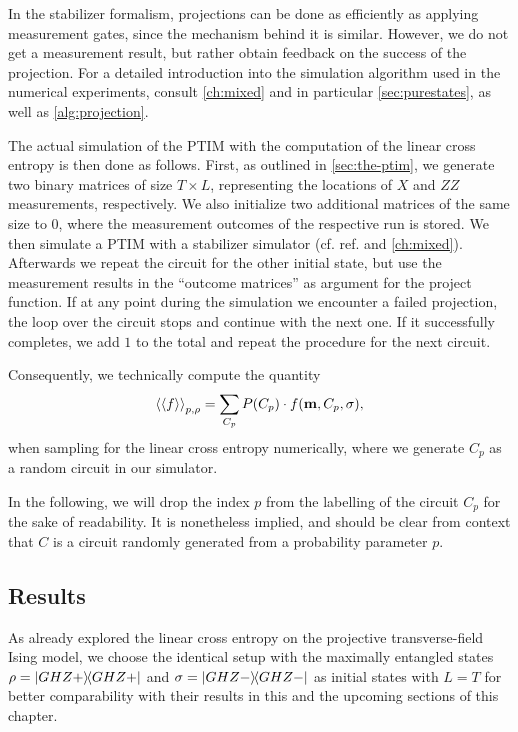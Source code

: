In the stabilizer
formalism, projections can be done as efficiently as applying measurement
gates,
since the mechanism behind it is similar. However, we do not get a measurement
result, but rather obtain feedback on the success of the projection.
For a detailed introduction into the
simulation algorithm used in the numerical experiments, consult \cref{ch:mixed}
and in particular \cref{sec:purestates}, as well as \cref{alg:projection}.

The actual simulation of the PTIM with the computation of the linear cross
entropy is then done as follows. First, as outlined in \cref{sec:the-ptim},
we generate two binary matrices of size $T\times L$, representing the
locations of $X$ and $ZZ$ measurements, respectively. We also initialize two
additional matrices of the same size to 0, where the measurement outcomes of
the respective run is stored. We then simulate a PTIM with a stabilizer
simulator (cf. ref. \cite{langCliffordCircuitSimulator2022} and
\cref{ch:mixed}). Afterwards we repeat the
circuit for the other initial state, but use the measurement results in the
\enquote{outcome matrices} as argument for the project function. If at any
point during the simulation we encounter a failed projection, the loop over the
circuit stops and continue with the next one. If it successfully completes, we
add $1$ to the total and repeat the procedure for the next circuit.

Consequently, we technically compute the quantity
\begin{align}\label{eq:sample-f-C}
  \expval{\expval{f}}_{p,\rho} = \sum_{C_p} P(C_p) \cdot f(\mathbf{m},C_p,
  \sigma)
,\end{align}
when sampling for the linear cross entropy numerically, where we generate $C_p$
as a random circuit in our simulator. 

In the following, we will drop the index $p$ from the labelling of the circuit
$C_p$ for the sake of readability. It is nonetheless implied, and should be
clear from context that $C$ is a circuit randomly generated from a probability
parameter $p$.

\subsection{Results}

As \cite{tikhanovskayaUniversalityCrossEntropy2023} already explored
the linear cross entropy on the projective transverse-field Ising model, we
choose the identical setup with the maximally entangled states $\rho = \dyad{GHZ+}$ and
$\sigma = \dyad{GHZ-}$ as initial states with $L=T$ for better comparability
with their results in this and the upcoming sections of this chapter.

